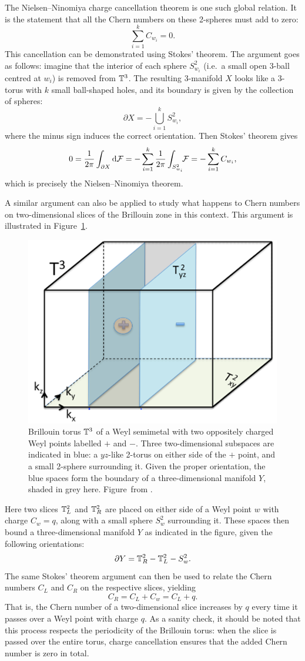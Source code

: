 The Nielsen--Ninomiya charge cancellation theorem is one such global relation. It is the statement that all the Chern numbers on these 2-spheres must add to zero:
\begin{equation}
	\sum_{i=1}^{k}C_{w_i} = 0.
\end{equation}
This cancellation can be demonstrated using Stokes' theorem. The argument goes as follows: imagine that the interior of each sphere $S_{w_i}^2$ (i.e.\ a small open 3-ball centred at $w_i$) is removed from $\mathbb{T}^3$. The resulting 3-manifold $X$ looks like a 3-torus with $k$ small ball-shaped holes, and its boundary is given by the collection of spheres:
\[
	\partial X = -\bigcup_{i=1}^k S_{w_i}^2,
\]
where the minus sign induces the correct orientation. Then Stokes' theorem gives
\[
	0 = \frac{1}{2\pi}\int_{\partial X} \dd{\mathcal{F}} = -\sum_{i=1}^{k}\frac{1}{2\pi}\int_{S_{w_i}^2}\!\!\mathcal{F} = -\sum_{i=1}^{k}C_{w_i},
\]
which is precisely the Nielsen--Ninomiya theorem.

A similar argument can also be applied to study what happens to Chern numbers on two-dimensional slices of the Brillouin zone in this context. This argument is illustrated in Figure~\ref{fig:Weyl-point-Stokes}.
\begin{figure}[htb!]
	\centering
	\includegraphics[width=.5\linewidth]{Images/Weyl-point-Stokes}
	\caption{
		Brillouin torus $\mathbb{T}^3$ of a Weyl semimetal with two oppositely charged Weyl points labelled $+$ and $-$. Three two-dimensional subspaces are indicated in blue: a $yz$-like 2-torus on either side of the $+$ point, and a small 2-sphere surrounding it. Given the proper orientation, the blue spaces form the boundary of a three-dimensional manifold $Y$, shaded in grey here.
		Figure~from \cite{Mathai_math-review}. %
	}
	\label{fig:Weyl-point-Stokes}
\end{figure}
Here two slices $\mathbb{T}_L^2$ and $\mathbb{T}_R^2$ are placed on either side of a Weyl point $w$ with charge $C_w = q$, along with a small sphere $S_w^2$ surrounding it. These spaces then bound a three-dimensional manifold $Y$ as indicated in the figure, given the following orientations:
\[
	\partial Y = \mathbb{T}_R^2 - \mathbb{T}_L^2 - S_w^2.
\]
The same Stokes' theorem argument can then be used to relate the Chern numbers $C_L$ and $C_R$ on the respective slices, yielding
\[
	C_R = C_L + C_w = C_L + q.
\]
That is, the Chern number of a two-dimensional slice increases by $q$ every time it passes over a Weyl point with charge $q$. As a sanity check, it should be noted that this process respects the periodicity of the Brillouin torus: when the slice is passed over the entire torus, charge cancellation ensures that the added Chern number is zero in total.

